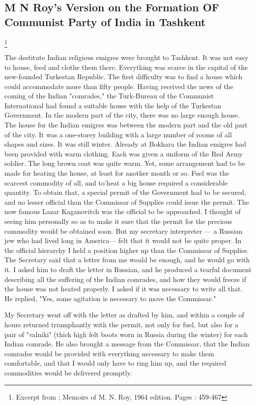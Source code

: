 
\begin{center}
\subsection{M N Roy's Version on the Formation OF Communist Party of India in Tashkent}
\footnote{Excerpt from ; Memoirs of M. N. Roy, 1964 edition. Pages : 459-467}
\end{center}

The destitute Indian religious emigres were brought to Tashkent. It was not easy to house, feed and clothe them there. Everything was scarce in the capital of the new-founded Turkestan Republic. The first difficulty was to find a house which could accommodate more than fifty people. Having received the news of the coming of the Indian "comrades," the Turk-Bureau of the Communist International had found a suitable house 
with the help of the Turkestan Government. In the modern part of the city, there was no large enough house. The house for the Indian emigres was between the modern part and the old part of the city. It was a one-storey building with a large number of rooms of all shapes and sizes. It was still winter. Already at Bokhara the Indian emigres had been provided with warm clothing. Each was given a uniform of the Red Army 
soldier. The long brown coat was quite warm. Yet, some arrangement had to be made for heating the house, at least for another month or so. Fuel was the scarcest commodity of all, and to'heat a big house required a considerable quantity. To obtain that, a special permit of the Government had to be secured, and no lesser official than the Commissar of Supplies could issue the permit. The now famous Lazar Kaganovitch 
was the official to be approached. I thought of seeing him personally so as to make it sure that the permit for the precious commodity would be obtained soon. But my secretary interpreter — a Russian jew who had lived long in America— felt that it would not be quite proper. In the official hierarchy I held a position higher up than the Commissar of Supplies. The Secretary said that a letter from me would be enough, and he 
would go with it. I asked him to draft the letter in Russian, and he produced a tearful document describing all the suffering of the Indian comrades, and how they would freeze if the house was not heated properly. I asked if it was necessary to write all that. He replied, "Yes, some agitation is necessary to move the Commissar." 

My Secretary went off with the letter as drafted by him, and within a couple of hours returned triumphantly with the permit, not only for fuel, but also for a pair of "valniki" (thick high felt boots worn in Russia during the winter) for each Indian comrade. He also brought a message from the Commissar, that the Indian comrades would be provided with everything necessary to make them comfortable, and that I would only have to ring him up, and the required commodities would be delivered promptly. 

